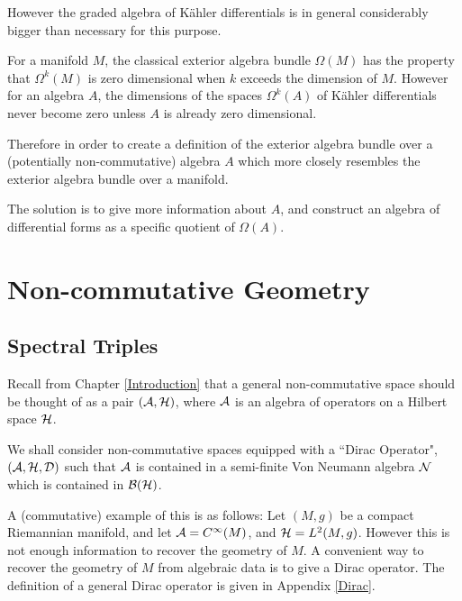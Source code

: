However the graded algebra of K\"ahler differentials
is in general considerably bigger than necessary for this purpose. 

For a manifold $M$, the classical exterior algebra
bundle $\Omega(M)$ has the property that $\Omega^k(M)$
is zero dimensional when $k$ exceeds the dimension of $M$. However 
for an algebra $A$, the dimensions of the spaces $\Omega^k(A)$
of K\"ahler differentials never become zero unless $A$
is already zero dimensional. 

Therefore in order to create a definition of the exterior
algebra bundle over a (potentially non-commutative) algebra $A$ which
more closely resembles the exterior algebra bundle over a manifold.

The solution is to give more information about $A$, and construct
an algebra of differential forms as a specific quotient of $\Omega(A)$.




\section{Non-commutative Geometry}
\subsection{Spectral Triples}
Recall from Chapter \ref{Introduction} that a general non-commutative
space should be thought of as a pair $(\mathcal{A},\mathcal{H})$, where $\mathcal{A}$
is an algebra of operators on a Hilbert space $\mathcal{H}$. 


We shall consider non-commutative spaces equipped with a ``Dirac Operator", $(\mathcal{A},\mathcal{H},\mathcal{D})$
such that $\mathcal{A}$ is contained in a semi-finite Von Neumann
algebra $\mathcal{N}$ which is contained in $\mathcal{B}(\mathcal{H})$.

A (commutative) example of this is as follows: Let $(M,g)$ be a compact Riemannian manifold,
and let $\mathcal{A} = C^\infty(M)$, and $\mathcal{H} = L^2(M,g)$. However
this is not enough information to recover the geometry of $M$. A convenient
way to recover the geometry of $M$ from algebraic data is to give a Dirac operator.
The definition of a general Dirac operator is given in Appendix \ref{Dirac}. 


